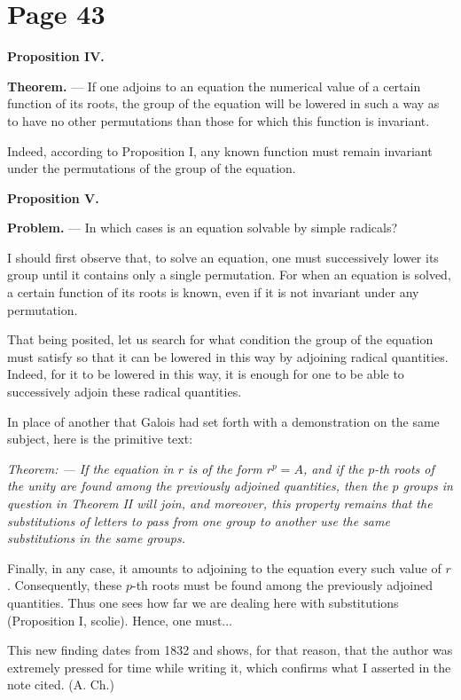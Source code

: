 \documentclass{article}
\begin{document}
\section*{Page 43}

\textbf{Proposition IV.}

\textbf{Theorem.} --- If one adjoins to an equation the numerical value of a certain function of its roots, the group of the equation will be lowered in such a way as to have no other permutations than those for which this function is invariant.

Indeed, according to Proposition I, any known function must remain invariant under the permutations of the group of the equation.

\textbf{Proposition V.}

\textbf{Problem.} --- In which cases is an equation solvable by simple radicals?

I should first observe that, to solve an equation, one must successively lower its group until it contains only a single permutation. For when an equation is solved, a certain function of its roots is known, even if it is not invariant under any permutation.

That being posited, let us search for what condition the group of the equation must satisfy so that it can be lowered in this way by adjoining radical quantities. Indeed, for it to be lowered in this way, it is enough for one to be able to successively adjoin these radical quantities.

In place of another that Galois had set forth with a demonstration on the same subject, here is the primitive text:

\emph{Theorem: --- If the equation in $r$ is of the form $r^p = A$, and if the $p$-th roots of the unity are found among the previously adjoined quantities, then the $p$ groups in question in Theorem II will join, and moreover, this property remains that the substitutions of letters to pass from one group to another use the same substitutions in the same groups.}

Finally, in any case, it amounts to adjoining to the equation every such value of $r$. Consequently, these $p$-th roots must be found among the previously adjoined quantities. Thus one sees how far we are dealing here with substitutions (Proposition I, scolie). Hence, one must...

This new finding dates from 1832 and shows, for that reason, that the author was extremely pressed for time while writing it, which confirms what I asserted in the note cited. (A. Ch.)
\end{document}
